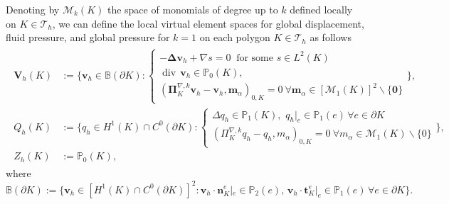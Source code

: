 \documentclass[smallextended]{svjour3}
\numberwithin{equation}{section}
\numberwithin{figure}{section}
\numberwithin{table}{section}
\newcommand\cero{{\boldsymbol{0}}}
\newcommand\bV{\mathbf{V}}
\newcommand\bPi{\boldsymbol{\Pi}}
\newcommand\nn{{\boldsymbol{n}}}
\newcommand\bv{\boldsymbol{v}}
\newcommand\cT{\mathcal{T}}
\newcommand{\bbP}{\mathbb{P}}
\newcommand\vdiv{{\mathop{\mathrm{div}}\nolimits}}
\newcommand\bDelta{\boldsymbol{\Delta}}
\newcommand\rmP{\mathrm{P}}
\begin{document}
	Denoting by $\mathcal{M}_k(K)$ the space of monomials of degree up to $k$  defined locally on  $K \in \cT_h$, we can define the local virtual element spaces for global displacement, fluid pressure, and global pressure for $k=1$ on each polygon $K \in \cT_h$
	  as follows
	\begin{align} \label{VE-spaces}
		\begin{split}
			\bV_h(K) & :=   \Biggr\{ \bv_h \in \mathbb{B}(\partial K):
				\begin{cases}
					- \bDelta \bv_h + \nabla s =0 ~ \text{ for some } s \in L^2(K) \\
					\vdiv \, \bv_h \in \mathbb{P}_0(K), \\
                    (\bPi_{K}^{\nabla,k} \bv_h - \bv_h, \boldsymbol{m}_{\alpha})_{0,K} = 0\ \forall \boldsymbol{m}_{\alpha} \in [\mathcal{M}_1 (K)]^2 \backslash \{ \cero \}
				\end{cases}\Biggr\}, \\
			Q_h(K) & := \Biggl\{ q_h \in H^1(K) \cap C^0(\partial K): 
            \begin{cases}
            \Delta q_h \in \mathbb{P}_1(K), \,\, q_h|_e \in \mathbb{P}_1(e) \,\forall e \in \partial K \\
(\Pi_{K}^{\nabla,k} q_h - q_h, m_{\alpha})_{0,K} = 0\ \forall m_{\alpha} \in \mathcal{M}_1 (K) \backslash \{ 0 \}             
            \end{cases}
			\Biggr\},\\
			Z_h(K) & := \mathbb{P}_0(K),
	\end{split} 	\end{align}
where $\mathbb{B}(\partial K):= \{ \bv_h \in [H^1(K) \cap C^0(\partial K)]^2: \bv_h \cdot \nn^e_K|_e \in \bbP_2(e), \, \bv_h \cdot \boldsymbol{t}^e_K|_e \in \bbP_1(e) \, \forall e \in \partial K\}.$
\end{document}

